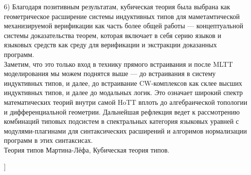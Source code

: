 \documentclass[twocolumn,10pt]{article}
\theoremstyle{definition}
\begin{document}
\begin{@twocolumnfalse}
6) Благодаря позитивным результатам, кубическая теория была выбрана как геометрическое расширение системы индуктивных
типов для маметамтической механизируемой верификации как часть более общей работы --- концептуальной системы
доказательства теорем, которая включает в себя серию языков и языковых средств как среду для верификации и экстракции доказанных программ.\\
Заметим, что это только вход в технику прямого встраивания и после MLTT моделирования мы можем
поднятся выше — до встраивания в систему индуктивных типов, и далее, до встраивание CW-комплексов как
склее высших индуктивных типов, и далее до модальных логик.
Это означает широкий спектр математических теорий внутри самой HoTT вплоть до алгебраической топологии и дифференциальной геометрии.
Дальнейшая рефлекция ведет к рассмотрению комбинаций типовых подсистем в спектральных категория языковых уравней
с модулями-плагинами для синтаксических расширений и алгоримов нормализации программ в этих синтаксисах. \\
 Теория типов Мартина-Лёфа, Кубическая теория типов.

 \end{@twocolumnfalse}

]
\end{document}
